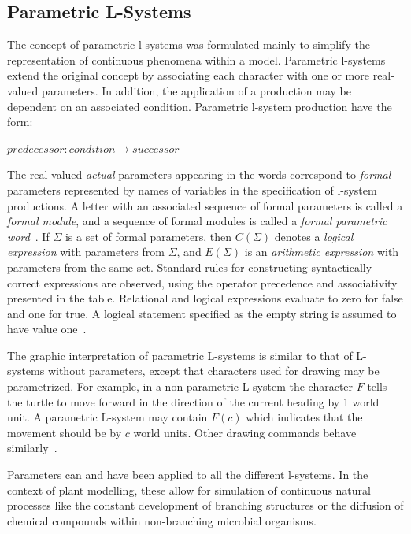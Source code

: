 \documentclass[]{final_report}
\begin{document}
\subsection*{Parametric L-Systems}

The concept of parametric l-systems was formulated mainly to simplify the representation of continuous phenomena within a model. Parametric l-systems extend the original concept by associating each character with one or more real-valued parameters. In addition, the application of a production may be dependent on an associated condition. Parametric l-system production have the form:
\begin{center}
    \begin{minipage}[c]{6.5cm}
        $predecessor:condition \rightarrow successor$
    \end{minipage}
\end{center}
The real-valued \emph{actual} parameters appearing in the words correspond to \emph{formal} parameters represented by names of variables in the specification of l-system productions. A letter with an associated sequence of formal parameters is called a \emph{formal module}, and a sequence of formal modules is called a \emph{formal parametric word}~\cite{HAN:1992}. If $\Sigma$ is a set of formal parameters, then $C(\Sigma)$ denotes a \emph{logical expression} with parameters from $\Sigma$, and $E(\Sigma)$ is an \emph{arithmetic expression} with parameters from the same set. Standard rules for constructing syntactically correct expressions are observed, using the operator precedence and associativity presented in the table. Relational and logical expressions evaluate to zero for false and one for true. A logical statement specified as the empty string is assumed to have value one~\cite{PRU:1996}.

The graphic interpretation of parametric L-systems is similar to that of L-systems without parameters, except that characters used for drawing may be parametrized. For example, in a non-parametric L-system the character $F$ tells the turtle to move forward in the direction of the current heading by 1 world unit. A parametric L-system may contain $F(c)$ which indicates that the movement should be by $c$ world units. Other drawing commands behave similarly~\cite{HAN:1992}. 

Parameters can and have been applied to all the different l-systems. In the context of plant modelling, these allow for simulation of continuous natural processes like the constant development of branching structures or the diffusion of chemical compounds within non-branching microbial organisms. 
\end{document}
